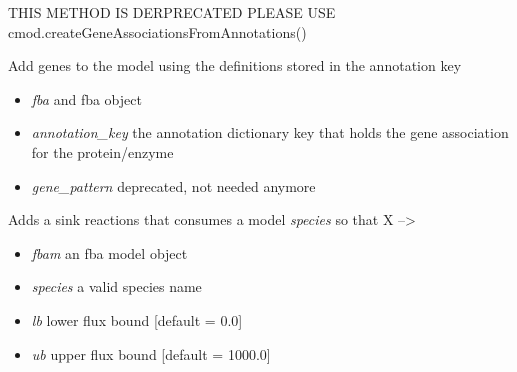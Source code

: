 \documentclass[a4paper,11pt,english]{sphinxmanual}
\begin{document}

\begin{fulllineitems}
\label{modules_doc:cbmpy.CBTools.addGenesFromAnnotations}
THIS METHOD IS DERPRECATED PLEASE USE cmod.createGeneAssociationsFromAnnotations()

Add genes to the model using the definitions stored in the annotation key
\begin{itemize}
\item {} 
\emph{fba} and fba object

\item {} 
\emph{annotation\_key} the annotation dictionary key that holds the gene association for the protein/enzyme

\item {} 
\emph{gene\_pattern} deprecated, not needed anymore

\end{itemize}

\end{fulllineitems}


\begin{fulllineitems}
\label{modules_doc:cbmpy.CBTools.addSinkReaction}
Adds a sink reactions that consumes a model \emph{species} so that X --\textgreater{}
\begin{itemize}
\item {} 
\emph{fbam} an fba model object

\item {} 
\emph{species} a valid species name

\item {} 
\emph{lb} lower flux bound {[}default = 0.0{]}

\item {} 
\emph{ub} upper flux bound {[}default = 1000.0{]}

\end{itemize}

\end{fulllineitems}

\end{document}
